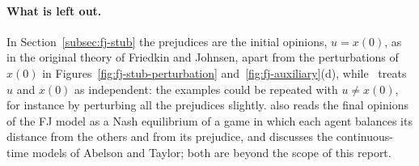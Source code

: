 \paragraph{What is left out.}
In Section~\ref{subsec:fj-stub} the prejudices are the initial opinions, $u = x(0)$, as in
the original theory of Friedkin and Johnsen, apart from the perturbations of $x(0)$ in
Figures~\ref{fig:fj-stub-perturbation} and~\ref{fig:fj-auxiliary}(d),
 while~\cite{proskurnikov2017tutorial}
treats $u$ and $x(0)$ as independent: the examples could be repeated with
$u \neq x(0)$, for instance by perturbing all the prejudices slightly.
\cite{proskurnikov2017tutorial} also reads the final opinions of the FJ model as a Nash
equilibrium of a game in which each agent balances its distance from the others and from
its prejudice, and discusses the continuous-time models of Abelson and Taylor; both are
beyond the scope of this report.
